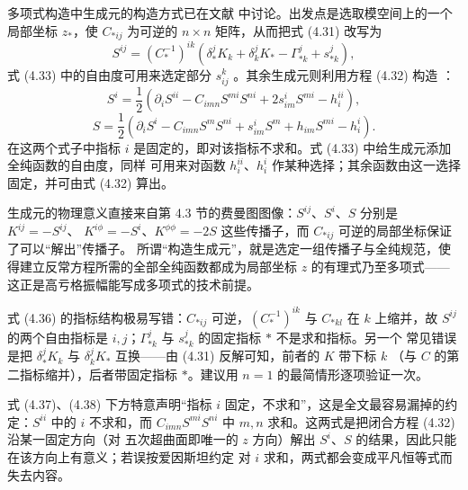 多项式构造中生成元的构造方式已在文献 \cite{ref26} 中讨论。出发点是选取模空间上的一个局部坐标 $z_*$，使
$C_{*ij}$ 为可逆的 $n\times n$ 矩阵，从而把式 (4.31) 改写为
\begin{equation}\tag{4.36}
S^{ij} = \left(C_*^{-1}\right)^{ik}
\left(\delta^j_* K_k + \delta^j_k K_* - \Gamma^j_{*k} + s^j_{*k}\right),
\end{equation}
式 (4.33) 中的自由度可用来选定部分 $s^k_{ij}$ \cite{ref26}。其余生成元则利用方程 (4.32) 构造 \cite{ref26}：
\begin{equation}\tag{4.37}
S^i = \frac{1}{2}\left(\partial_i S^{ii} - C_{imn}S^{mi}S^{ni}
     + 2s^i_{im}S^{mi} - h_i^{ii}\right),
\end{equation}
\begin{equation}\tag{4.38}
S = \frac{1}{2}\left(\partial_i S^i - C_{imn}S^m S^{ni}
   + s^i_{im}S^m + h_{im}S^{mi} - h_i^i\right).
\end{equation}
在这两个式子中指标 $i$ 是固定的，即对该指标不求和。式 (4.33) 中给生成元添加全纯函数的自由度，同样
可用来对函数 $h_i^{ii}$、$h_i^i$ 作某种选择；其余函数由这一选择固定，并可由式 (4.32) 算出。

\begin{yizhu}[物理图像]
生成元的物理意义直接来自第 4.3 节的费曼图图像：$S^{ij}$、$S^i$、$S$ 分别是 $K^{ij}=-S^{ij}$、
$K^{i\phi}=-S^i$、$K^{\phi\phi}=-2S$ 这些传播子，而 $C_{*ij}$ 可逆的局部坐标保证了可以“解出”传播子。
所谓“构造生成元”，就是选定一组传播子与全纯规范，使得建立反常方程所需的全部全纯函数都成为局部坐标
$z$ 的有理式乃至多项式——这正是高亏格振幅能写成多项式的技术前提。
\end{yizhu}

\begin{yizhu}[易错点]
式 (4.36) 的指标结构极易写错：$C_{*ij}$ 可逆，$(C_*^{-1})^{ik}$ 与 $C_{*kl}$ 在 $k$ 上缩并，故
$S^{ij}$ 的两个自由指标是 $i,j$；$\Gamma^j_{*k}$ 与 $s^j_{*k}$ 的固定指标 $*$ 不是求和指标。另一个
常见错误是把 $\delta^j_* K_k$ 与 $\delta^j_k K_*$ 互换——由 (4.31) 反解可知，前者的 $K$ 带下标 $k$
（与 $C$ 的第二指标缩并），后者带固定指标 $*$。建议用 $n=1$ 的最简情形逐项验证一次。
\end{yizhu}

\begin{yizhu}[易错点]
式 (4.37)、(4.38) 下方特意声明“指标 $i$ 固定，不求和”，这是全文最容易漏掉的约定：$S^{ii}$ 中的
$i$ 不求和，而 $C_{imn}S^{mi}S^{ni}$ 中 $m,n$ 求和。这两式是把闭合方程 (4.32) 沿某一固定方向（对
五次超曲面即唯一的 $z$ 方向）解出 $S^i$、$S$ 的结果，因此只能在该方向上有意义；若误按爱因斯坦约定
对 $i$ 求和，两式都会变成平凡恒等式而失去内容。
\end{yizhu}

